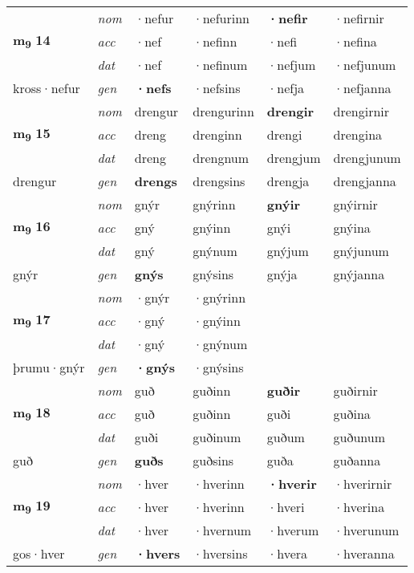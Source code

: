\begin{longtable}[l]{X>{\footnotesize\itshape}XXXXX}
\multirow{3}{*}{{{\textbf{m{\textsubscript{9}}} \Large{\textbf{14}}}}} & nom & ·nefur & ·nefurinn & \textbf{·nefir} & ·nefirnir \\*
 & acc & ·nef & ·nefinn & ·nefi & ·nefina \\*
 & dat & ·nef & ·nefinum & ·nefjum & ·nefjunum \\*
 {\footnotesize{kross\allowbreak ·nefur}} & gen & \textbf{·nefs} & ·nefsins & ·nefja & ·nefjanna \\
\cmidrule{1-6}

\multirow{3}{*}{{{\textbf{m{\textsubscript{9}}} \Large{\textbf{15}}}}} & nom & drengur & drengurinn & \textbf{drengir} & drengirnir \\*
 & acc & dreng & drenginn & drengi & drengina \\*
 & dat & dreng & drengnum & drengjum & drengjunum \\*
 {\footnotesize{drengur}} & gen & \textbf{drengs} & drengsins & drengja & drengjanna \\
\cmidrule{1-6}

\multirow{3}{*}{{{\textbf{m{\textsubscript{9}}} \Large{\textbf{16}}}}} & nom & gnýr & gnýrinn & \textbf{gnýir} & gnýirnir \\*
 & acc & gný & gnýinn & gnýi & gnýina \\*
 & dat & gný & gnýnum & gnýjum & gnýjunum \\*
 {\footnotesize{gnýr}} & gen & \textbf{gnýs} & gnýsins & gnýja & gnýjanna \\
\cmidrule{1-6}

\multirow{3}{*}{{{\textbf{m{\textsubscript{9}}} \Large{\textbf{17}}}}} & nom & ·gnýr & ·gnýrinn & \textbf{} &  \\*
 & acc & ·gný & ·gnýinn &  &  \\*
 & dat & ·gný & ·gnýnum &  &  \\*
 {\footnotesize{þrumu\allowbreak ·gnýr}} & gen & \textbf{·gnýs} & ·gnýsins &  &  \\
\cmidrule{1-6}

\multirow{3}{*}{{{\textbf{m{\textsubscript{9}}} \Large{\textbf{18}}}}} & nom & guð & guðinn & \textbf{guðir} & guðirnir \\*
 & acc & guð & guðinn & guði & guðina \\*
 & dat & guði & guðinum & guðum & guðunum \\*
 {\footnotesize{guð}} & gen & \textbf{guðs} & guðsins & guða & guðanna \\
\cmidrule{1-6}

\multirow{3}{*}{{{\textbf{m{\textsubscript{9}}} \Large{\textbf{19}}}}} & nom & ·hver & ·hverinn & \textbf{·hverir} & ·hverirnir \\*
 & acc & ·hver & ·hverinn & ·hveri & ·hverina \\*
 & dat & ·hver & ·hvernum & ·hverum & ·hverunum \\*
 {\footnotesize{gos\allowbreak ·hver}} & gen & \textbf{·hvers} & ·hversins & ·hvera & ·hveranna \\
\cmidrule{1-6}


\end{longtable}
